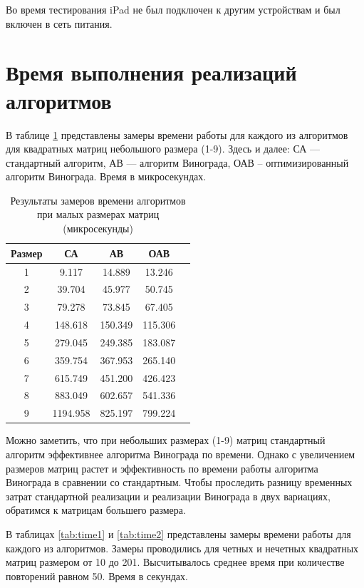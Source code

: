 Во время тестирования iPad не был подключен к другим устройствам и был включен в сеть питания.

\section{Время выполнения реализаций алгоритмов}

В таблице \ref{tab:time0} представлены замеры времени работы для каждого из алгоритмов для квадратных матриц небольшого размера (1-9). Здесь и далее: СА — стандартный алгоритм, АВ — алгоритм Винограда, ОАВ -- оптимизированный алгоритм Винограда. Время в микросекундах.

\begin{table}[h]
	\begin{center}
		\caption{\label{tab:time0}Результаты замеров времени алгоритмов при малых размерах матриц (микросекунды)}
		\begin{tabular}{|c|c|c|c|c|}
		\hline
		Размер & СА &  АВ & ОАВ \\
		\hline
		1  & 9.117 & 14.889 & 13.246\\
		\hline
		2  & 39.704 & 45.977 & 50.745\\
		\hline
		3  & 79.278 & 73.845 & 67.405 \\
		\hline
		4  & 148.618 & 150.349 & 115.306 \\
		\hline
		5  & 279.045 & 249.385 & 183.087 \\
		\hline
		6  & 359.754 & 367.953 & 265.140 \\
		\hline
		7  & 615.749 & 451.200 & 426.423 \\
		\hline
		8  & 883.049 & 602.657 & 541.336 \\
		\hline
		9  & 1194.958 & 825.197 & 799.224 \\
		\hline
		
		\end{tabular}
	\end{center}
\end{table}

Можно заметить, что при небольших  размерах (1-9) матриц стандартный алгоритм эффективнее алгоритма Винограда по времени. Однако с увеличением размеров матриц растет и эффективность по времени работы алгоритма Винограда в сравнении со стандартным. Чтобы проследить разницу временных затрат стандартной реализации и реализации Винограда в двух вариациях, обратимся к матрицам большего размера. 

В таблицах \ref{tab:time1} и \ref{tab:time2} представлены замеры времени работы для каждого из алгоритмов. 
Замеры проводились для четных и нечетных квадратных матриц размером от 10 до 201. Высчитывалось среднее время при количестве повторений равном 50. Время в секундах.

